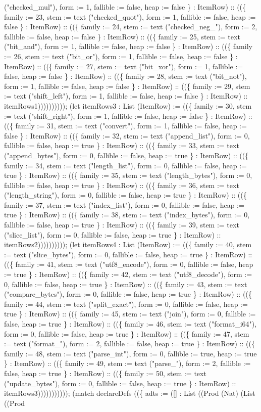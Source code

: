 \documentclass[11pt]{article}
\begin{document}
("checked\_mul"), form := 1, fallible := false, heap := false \} : ItemRow) :: ((\{ family := 23, stem := text ("checked\_quot"), form := 1, fallible := false, heap := false \} : ItemRow) :: ((\{ family := 24, stem := text ("checked\_neg\_"), form := 2, fallible := false, heap := false \} : ItemRow) :: ((\{ family := 25, stem := text ("bit\_and"), form := 1, fallible := false, heap := false \} : ItemRow) :: ((\{ family := 26, stem := text ("bit\_or"), form := 1, fallible := false, heap := false \} : ItemRow) :: ((\{ family := 27, stem := text ("bit\_xor"), form := 1, fallible := false, heap := false \} : ItemRow) :: ((\{ family := 28, stem := text ("bit\_not"), form := 1, fallible := false, heap := false \} : ItemRow) :: ((\{ family := 29, stem := text ("shift\_left"), form := 1, fallible := false, heap := false \} : ItemRow) :: itemRows1)))))))))); (let itemRows3 : List (ItemRow) := ((\{ family := 30, stem := text ("shift\_right"), form := 1, fallible := false, heap := false \} : ItemRow) :: ((\{ family := 31, stem := text ("convert"), form := 1, fallible := false, heap := false \} : ItemRow) :: ((\{ family := 32, stem := text ("append\_list"), form := 0, fallible := false, heap := true \} : ItemRow) :: ((\{ family := 33, stem := text ("append\_bytes"), form := 0, fallible := false, heap := true \} : ItemRow) :: ((\{ family := 34, stem := text ("length\_list"), form := 0, fallible := false, heap := true \} : ItemRow) :: ((\{ family := 35, stem := text ("length\_bytes"), form := 0, fallible := false, heap := true \} : ItemRow) :: ((\{ family := 36, stem := text ("length\_string"), form := 0, fallible := false, heap := true \} : ItemRow) :: ((\{ family := 37, stem := text ("index\_list"), form := 0, fallible := false, heap := true \} : ItemRow) :: ((\{ family := 38, stem := text ("index\_bytes"), form := 0, fallible := false, heap := true \} : ItemRow) :: ((\{ family := 39, stem := text ("slice\_list"), form := 0, fallible := false, heap := true \} : ItemRow) :: itemRows2)))))))))); (let itemRows4 : List (ItemRow) := ((\{ family := 40, stem := text ("slice\_bytes"), form := 0, fallible := false, heap := true \} : ItemRow) :: ((\{ family := 41, stem := text ("utf8\_encode"), form := 0, fallible := false, heap := true \} : ItemRow) :: ((\{ family := 42, stem := text ("utf8\_decode"), form := 0, fallible := false, heap := true \} : ItemRow) :: ((\{ family := 43, stem := text ("compare\_bytes"), form := 0, fallible := false, heap := true \} : ItemRow) :: ((\{ family := 44, stem := text ("split\_exact"), form := 0, fallible := false, heap := true \} : ItemRow) :: ((\{ family := 45, stem := text ("join"), form := 0, fallible := false, heap := true \} : ItemRow) :: ((\{ family := 46, stem := text ("format\_i64"), form := 0, fallible := false, heap := true \} : ItemRow) :: ((\{ family := 47, stem := text ("format\_"), form := 2, fallible := false, heap := true \} : ItemRow) :: ((\{ family := 48, stem := text ("parse\_int"), form := 0, fallible := true, heap := true \} : ItemRow) :: ((\{ family := 49, stem := text ("parse\_"), form := 2, fallible := false, heap := true \} : ItemRow) :: ((\{ family := 50, stem := text ("update\_bytes"), form := 0, fallible := false, heap := true \} : ItemRow) :: itemRows3))))))))))); (match declareDefs ((\{ adts := ([] : List ((Prod (Nat) (List ((Prod 
\end{document}
